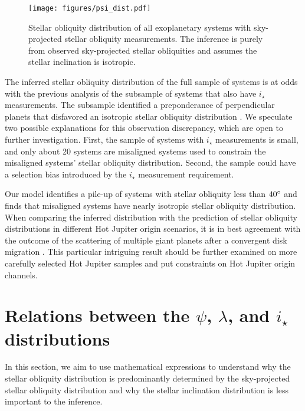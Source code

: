 \documentclass[twocolumn,times]{aastex631}
\begin{document}
\begin{figure}[ht!]
    \begin{centering}
        \texttt{[image: figures/psi\_dist.pdf]}
        \caption{Stellar obliquity distribution of all exoplanetary systems with sky-projected stellar obliquity measurements. The inference is purely from observed sky-projected stellar obliquities and assumes the stellar inclination is isotropic.}
        \label{fig:psi_dist}
    \end{centering}
\end{figure}

The inferred stellar obliquity distribution of the full sample of systems is at odds with the previous analysis of the subsample of systems that also have $i_\star$ measurements. The subsample identified a preponderance of perpendicular planets that disfavored an isotropic stellar obliquity distribution \citep{Albrecht21}. We speculate two possible explanations for this observation discrepancy, which are open to further investigation.
First, the sample of systems with $i_\star$ measurements is small, and only about 20 systems are misaligned systems used to constrain the misaligned systems' stellar obliquity distribution. Second, the sample could have a selection bias introduced by the $i_\star$ measurement requirement.

Our model identifies a pile-up of systems with stellar obliquity less than $40\mbox{$^\circ$}$ and finds that misaligned systems have nearly isotropic stellar obliquity distribution. When comparing the inferred distribution with the prediction of stellar obliquity distributions in different Hot Jupiter origin scenarios, it is in best agreement with the outcome of the scattering of multiple giant planets after a convergent disk migration \citep[e.g.,][]{Nagasawa11, Beague12}. This particular intriguing result should be further examined on more carefully selected Hot Jupiter samples and put constraints on Hot Jupiter origin channels.

\section{Relations between the $\psi$, $\lambda$, and \lowercase{$i_\star$} distributions}\label{sec:jacobian}

In this section, we aim to use mathematical expressions to understand why the stellar obliquity distribution is predominantly determined by the sky-projected stellar obliquity distribution and why the stellar inclination distribution is less important to the inference.
\end{document}
